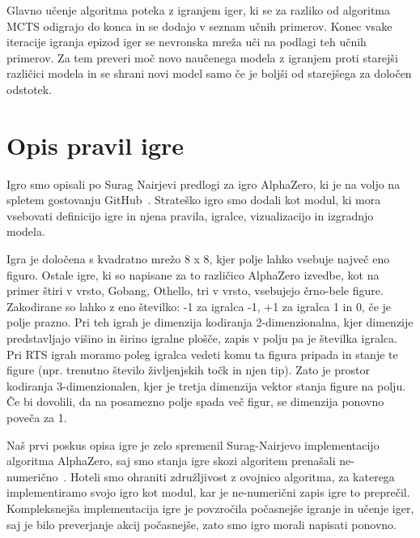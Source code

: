 \documentclass[a4paper, 12pt]{book}
\begin{document}
Glavno učenje algoritma poteka z igranjem iger, ki se za razliko od algoritma MCTS odigrajo do konca in se dodajo v seznam učnih primerov.
Konec vsake iteracije igranja epizod iger se nevronska mreža uči na podlagi teh učnih primerov.
Za tem preveri moč novo naučenega modela z igranjem proti starejši različici modela in se shrani novi model samo če je boljši od starejšega za določen odstotek.


\chapter{Opis pravil igre}
\label{chpravilaigre}

Igro smo opisali po Surag Nairjevi predlogi za igro AlphaZero, ki je na voljo na spletem gostovanju GitHub~\cite{alphazerogeneral}.
Strateško igro smo dodali kot modul, ki mora vsebovati definicijo igre in njena pravila, igralce, vizualizacijo in izgradnjo modela.

Igra je določena s kvadratno mrežo 8 x 8, kjer polje lahko vsebuje največ eno figuro.
Ostale igre, ki so napisane za to različico AlphaZero izvedbe, kot na primer štiri v vrsto, Gobang, Othello, tri v vrsto, vsebujejo črno-bele figure.
Zakodirane so lahko z eno številko: -1 za igralca -1, +1 za igralca 1 in 0, če je polje prazno.
Pri teh igrah je dimenzija kodiranja 2-dimenzionalna, kjer dimenzije predstavljajo višino in širino igralne plošče, zapis v polju pa je številka igralca.
Pri RTS igrah moramo poleg igralca vedeti komu ta figura pripada in stanje te figure (npr. trenutno število življenjskih točk in njen tip).
Zato je prostor kodiranja 3-dimenzionalen, kjer je tretja dimenzija vektor stanja figure na polju.
Če bi dovolili, da na posamezno polje spada več figur, se dimenzija ponovno poveča za 1.

Naš prvi poskus opisa igre je zelo spremenil Surag-Nairjevo implementacijo algoritma AlphaZero, saj smo stanja igre skozi algoritem prenašali ne-numerično~\cite{objectAlphaZero}.
Hoteli smo ohraniti združljivost z ovojnico algoritma, za katerega implementiramo svojo igro kot modul, kar je ne-numerični zapis igre to preprečil.
Kompleksnejša implementacija igre je povzročila počasnejše igranje in učenje iger, saj je bilo preverjanje akcij počasnejše, zato smo igro morali napisati ponovno.
\end{document}
